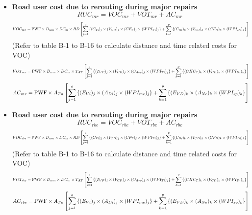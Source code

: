 \documentclass[12pt,a4paper]{article}
\begin{document}
\begin{itemize}
  \item \textbf{Road user cost due to rerouting during major repairs}
    \[ RUC_{mr} = VOC_{mr} + VOT_{mr} + AC_{mr} \]
    \[
    \resizebox{\linewidth}{!}{$\displaystyle
    VOC_{mr} = \mathrm{PWF} \times D_{wm} \times DC_m \times RD \left[
      \sum_{j=1}^{o} \left\{ (C_{Ti})_j \times (V_{CD})_j \times (CF_T)_j \times (WPI_{Ti})_j \right\}
      + \sum_{k=1}^{p} \left\{ (C_{Di})_k \times (V_{CD})_k \times (CF_D)_k \times (WPI_{Di})_k \right\}
    \right]
    $}
    \]
    (Refer to table B-1 to B-16 to calculate distance and time related costs for VOC)
    \[
    \resizebox{\linewidth}{!}{$\displaystyle
    VOT_{mr} = \mathrm{PWF} \times D_{wm} \times DC_m \times T_{AT} \left[
      \sum_{j=1}^{o} \left\{ (T_{VP})_j \times (V_{CD})_j \times (O_{Avg})_j \times (WPI_{Ti})_j \right\}
      + \sum_{k=1}^{p} \left\{ (CHC_T)_k \times (V_{CD})_k \times (WPI_{Di})_k \right\}
    \right]
    $}
    \]
    \[
    \resizebox{\linewidth}{!}{$\displaystyle
    AC_{mr} = \mathrm{PWF} \times A_{Tn} \left[
      \sum_{j=1}^{o} \left\{ (E_{Vi})_j \times (A_{Di})_j \times (WPI_{me})_j \right\}
      + \sum_{k=1}^{p} \left\{ (E_{VD})_k \times (A_{Ne})_k \times (WPI_{sp})_k \right\}
    \right]
    $}
    \]

  \item \textbf{Road user cost due to rerouting during major repairs}
    \[ RUC_{rbe} = VOC_{rbe} + VOT_{rbe} + AC_{rbe} \]
    \[
    \resizebox{\linewidth}{!}{$\displaystyle
    VOC_{rbe} = \mathrm{PWF} \times D_{wm} \times DC_m \times RD \left[
      \sum_{j=1}^{o} \left\{ (C_{Ti})_j \times (V_{CD})_j \times (CF_T)_j \times (WPI_{Ti})_j \right\}
      + \sum_{k=1}^{p} \left\{ (C_{Di})_k \times (V_{CD})_k \times (CF_D)_k \times (WPI_{Di})_k \right\}
    \right]
    $}
    \]
    (Refer to table B-1 to B-16 to calculate distance and time related costs for VOC)
    \[
    \resizebox{\linewidth}{!}{$\displaystyle
    VOT_{rbe} = \mathrm{PWF} \times D_{wm} \times DC_m \times T_{AT} \left[
      \sum_{j=1}^{o} \left\{ (T_{VP})_j \times (V_{CD})_j \times (O_{Avg})_j \times (WPI_{Ti})_j \right\}
      + \sum_{k=1}^{p} \left\{ (CHC_T)_k \times (V_{CD})_k \times (WPI_{Di})_k \right\}
    \right]
    $}
    \]
    \[
    \resizebox{\linewidth}{!}{$\displaystyle
    AC_{rbe} = \mathrm{PWF} \times A_{Tn} \left[
      \sum_{j=1}^{o} \left\{ (E_{Vi})_j \times (A_{Di})_j \times (WPI_{me})_j \right\}
      + \sum_{k=1}^{p} \left\{ (E_{VD})_k \times (A_{Ne})_k \times (WPI_{sp})_k \right\}
    \right]
    $}
    \]
\end{itemize}
\end{document}
